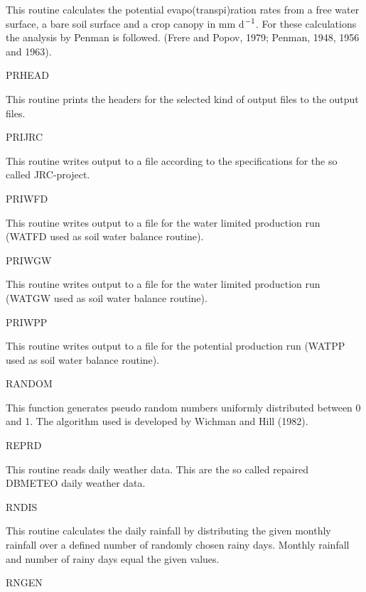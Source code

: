 \begin{indenting}{2.54cm}
This routine calculates the potential evapo(transpi)ration rates from a free
water surface, a bare soil surface and a crop canopy in mm d$^{{\rm -1}}$. For these
calculations the analysis by Penman is followed. (Frere and Popov, 1979;
Penman, 1948, 1956 and 1963).
\end{indenting}
PRHEAD
\testlastline

\begin{indenting}{2.54cm}
This routine prints the headers for the selected kind of output files to the
output files.
\end{indenting}
PRIJRC
\testlastline

\begin{indenting}{2.54cm}
This routine writes output to a file according to the specifications for the so
called JRC-project.
\end{indenting}
PRIWFD
\testlastline

\begin{indenting}{2.54cm}
This routine writes output to a file for the water limited production run
(WATFD used as soil water balance routine).
\end{indenting}
PRIWGW
\testlastline

\begin{indenting}{2.54cm}
This routine writes output to a file for the water limited production run
(WATGW used as soil water balance routine).
\end{indenting}
PRIWPP
\testlastline

\begin{indenting}{2.54cm}
This routine writes output to a file for the potential production run (WA\-TPP used as soil water balance routine).
\end{indenting}
RANDOM
\testlastline

\begin{indenting}{2.54cm}
This function generates pseudo random numbers uniformly distributed
between 0 and 1. The algorithm used is developed by Wichman and Hill
(1982).
\end{indenting}
REPRD
\testlastline

\begin{indenting}{2.54cm}
This routine reads daily weather data. This are the so called repaired
DBMETEO daily weather data.
\end{indenting}
RNDIS
\testlastline

\begin{indenting}{2.54cm}
This routine calculates the daily rainfall by distributing the given monthly
rainfall over a defined number of randomly chosen rainy days. Monthly
rainfall and number of rainy days equal the given values. 
\end{indenting}
RNGEN
\testlastline

